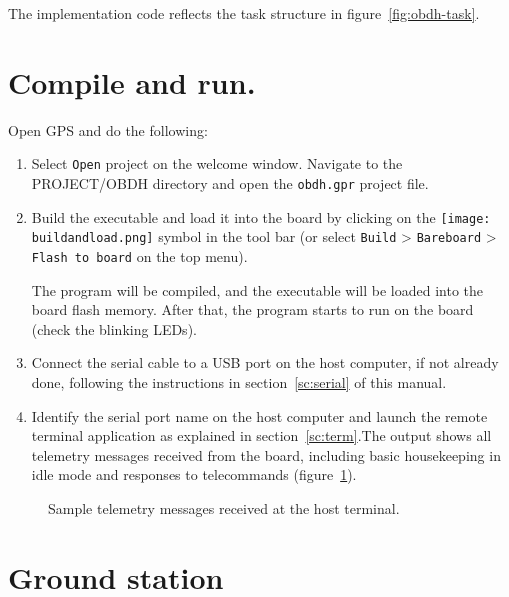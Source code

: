 The implementation code reflects the task structure in figure~\ref{fig:obdh-task}.

\section{Compile and run.}

Open GPS and do the following:
\begin{enumerate}
\item Select {\tt Open} project on the welcome window. Navigate to the PROJECT/OBDH directory and open the {\tt obdh.gpr} project file.
\item Build the executable and load it into the board by clicking on the \hbox{\texttt{[image: buildandload.png]}} symbol in the tool bar (or select {\tt Build} > {\tt Bareboard} > {\tt Flash to board} on the top menu).

The program will be compiled, and the executable will be loaded into the board flash memory. After that, the program starts to run on the board (check the blinking LEDs).
\item Connect the serial cable to a USB port on the host computer, if not already done, following the instructions in section~\ref{sc:serial} of this manual.

\item Identify the serial port name on the host computer and launch the remote terminal application as explained in section~\ref{sc:term}.The output shows all telemetry messages received from the board, including basic housekeeping
in idle mode and responses to telecommands (figure~\ref{fig:obdh-output}).
\end{enumerate}

\begin{figure}[h]
            \caption{Sample telemetry messages received at the host terminal.}
            \label{fig:obdh-output}
\end{figure}

\section{Ground station}

